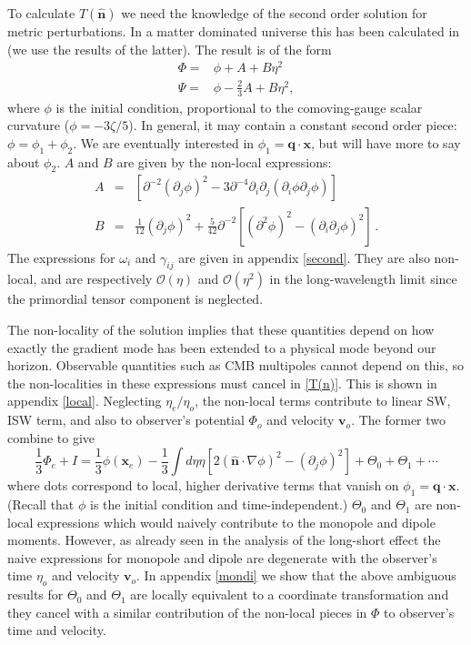 \documentclass[12pt]{article}
\numberwithin{equation}{section}
\def\bsb{\boldsymbol}
\def\bea{\begin{eqnarray}}
\def\eea{\end{eqnarray}}
\def\be{\begin{equation}}
\def\ee{\end{equation}}
\def\d{\partial}
\def\n{\bsb{\hat n}}
\def\O{\mathcal{O}}
\def\x{{\bsb x}}
\def\v{\bsb v}
\def\q{{\bsb q}}
\begin{document}
To calculate $T(\n)$ we need the knowledge of the second order solution for metric perturbations. In a matter dominated universe this has been calculated in \cite{Matarrese,Bartolo,Creminelli_action} (we use the results of the latter). The result is of the form
\be
\begin{split}
\label{PhiPsi2}
\Phi =& \phi +A+B\eta^2\\[10pt]
\Psi =& \phi -\frac{2}{3}A+B\eta^2,
\end{split}
\ee
where $\phi$ is the initial condition, proportional to the comoving-gauge scalar curvature ($\phi=-3\zeta/5$). In general, it may contain a constant second order piece: $\phi = \phi_1+\phi_2$. We are eventually interested in $\phi_1=\q\cdot\x$, but will have more to say about $\phi_2$. $A$ and $B$ are given by the non-local expressions:
\bea
A & =  &\left[\d^{-2}(\d_j\phi)^2 -3\d^{-4}\d_i\d_j(\d_i\phi\d_j\phi) \right]\\[10pt]
\label{B}
B  & = &\frac{1}{12}(\d_j\phi)^2+\frac{5}{42}\d^{-2}\left[(\d^2\phi)^2-(\d_i\d_j\phi)^2\right] \,.
\eea
The expressions for $\omega_i$ and $\gamma_{ij}$ are given in appendix \ref{second}. They are also non-local, and are respectively $\O(\eta)$ and $\O(\eta^2)$ in the long-wavelength limit since the primordial tensor component is neglected. 

The non-locality of the solution implies that these quantities depend on how exactly the gradient mode has been extended to a physical mode beyond our horizon. Observable quantities such as CMB multipoles cannot depend on this, so the non-localities in these expressions must cancel in \eqref{T(n)}. This is shown in appendix \ref{local}. Neglecting $\eta_e/\eta_o$, the non-local terms contribute to linear SW, ISW term, and also to observer's potential $\Phi_o$ and velocity $\v_o$. The former two combine to give
\be
\label{Phi+I}
\frac{1}{3}\Phi_e+I= \frac{1}{3}\phi(\x_e) 
-\frac{1}{3}\int d\eta \eta [2(\bsb{\hat n} \cdot \nabla \phi)^2-(\d_j \phi)^2]+\Theta_0+\Theta_1 + \cdots
\ee
where dots correspond to local, higher derivative terms that vanish on $\phi_1 = \q\cdot \x$. (Recall that $\phi$ is the initial condition and time-independent.) $\Theta_0$ and $\Theta_1$ are non-local expressions which would naively contribute to the monopole and dipole moments. However, as already seen in the analysis of the long-short effect the naive expressions for monopole and dipole are degenerate with the observer's time $\eta_o$ and velocity $\v_o$. In appendix \ref{mondi} we show that the above ambiguous results for $\Theta_0$ and $\Theta_1$ are locally equivalent to a coordinate transformation and they cancel with a similar contribution of the non-local pieces in $\Phi$ to observer's time and velocity. 
\end{document}
